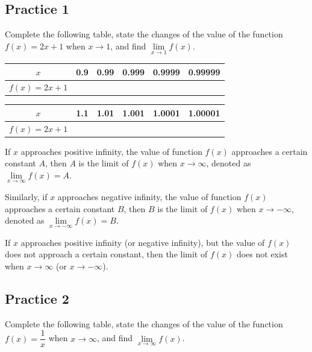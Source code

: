 \documentclass[12pt]{report}
\begin{document}
\subsection{Practice 1}

Complete the following table, state the changes of the value of the function $f
  (x) = 2x + 1$ when $x \to 1$, and find $\lim\limits_{x \to 1} f (x)$.

\begin{center}
  \begin{tabular}{|c|c|c|c|c|c|}
    \hline
    $x$              & 0.9 & 0.99 & 0.999 & 0.9999 & 0.99999 \\
    \hline
    $f (x) = 2x + 1$ &     &      &       &        &         \\
    \hline
  \end{tabular}
\end{center}
\begin{center}
  \begin{tabular}{|c|c|c|c|c|c|}
    \hline
    $x$              & 1.1 & 1.01 & 1.001 & 1.0001 & 1.00001 \\
    \hline
    $f (x) = 2x + 1$ &     &      &       &        &         \\
    \hline
  \end{tabular}
\end{center}

If $x$ approaches positive infinity, the value of function $f (x)$ approaches a
certain constant $A$, then $A$ is the limit of $f (x)$ when $x \to \infty$,
denoted as $\lim\limits_{x \to \infty} f (x) = A$.

Similarly, if $x$ approaches negative infinity, the value of function $f (x)$
approaches a certain constant $B$, then $B$ is the limit of $f (x)$ when $x \to
  -\infty$, denoted as $\lim\limits_{x \to -\infty} f (x) = B$.

If $x$ approaches positive infinity (or negative infinity), but the value of $f
  (x)$ does not approach a certain constant, then the limit of $f (x)$ does not
exist when $x \to \infty$ (or $x \to -\infty$).

\subsection{Practice 2}

Complete the following table, state the changes of the value of the function $f
  (x) = \dfrac{1}{x}$ when $x \to \infty$, and find $\lim\limits_{x \to \infty} f
  (x)$.
\end{document}
